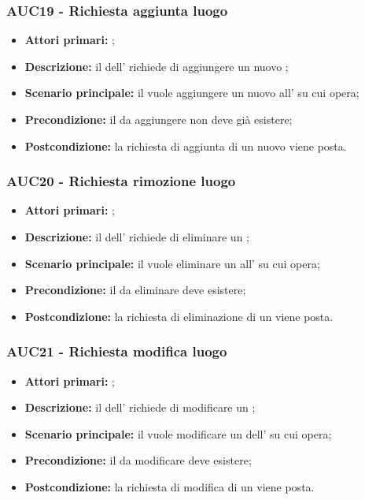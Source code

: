 \documentclass[casi-duso]{subfiles}
\begin{document}
\subsubsection{AUC19 - Richiesta aggiunta luogo}
\label{subsub:AUC19}
\begin{itemize}
  \item \textbf{Attori primari:} ;
  \item \textbf{Descrizione:} il  dell' richiede di aggiungere un nuovo ;
  \item \textbf{Scenario principale:} il  vuole aggiungere un nuovo  all' su cui opera;
  \item \textbf{Precondizione:} il  da aggiungere non deve già esistere;
  \item \textbf{Postcondizione:} la richiesta di aggiunta di un nuovo  viene posta.
\end{itemize}

\subsubsection{AUC20 - Richiesta rimozione luogo}
\label{subsub:AUC20}
\begin{itemize}
  \item \textbf{Attori primari:} ;
  \item \textbf{Descrizione:} il  dell' richiede di eliminare un ;
  \item \textbf{Scenario principale:} il  vuole eliminare un  all' su cui opera;
  \item \textbf{Precondizione:} il  da eliminare deve esistere;
  \item \textbf{Postcondizione:} la richiesta di eliminazione di un  viene posta.
\end{itemize}

\subsubsection{AUC21 - Richiesta modifica luogo}
\label{subsub:AUC21}
\begin{itemize}
  \item \textbf{Attori primari:} ;
  \item \textbf{Descrizione:} il  dell' richiede di modificare un ;
  \item \textbf{Scenario principale:} il  vuole modificare un  dell' su cui opera;
  \item \textbf{Precondizione:} il  da modificare deve esistere;
  \item \textbf{Postcondizione:} la richiesta di modifica di un  viene posta.
\end{itemize}
\end{document}
